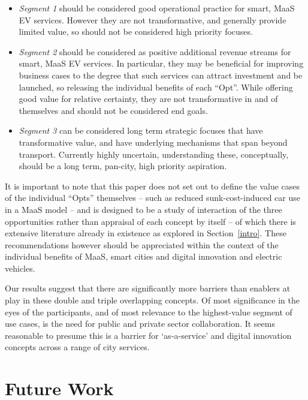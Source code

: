 \documentclass[journal]{IEEEtran}
\begin{document}
\begin{itemize}
\item {\emph{Segment 1}} should be considered good operational practice for
  smart, MaaS EV services. However they are not transformative, and
  generally provide limited value, so should not be considered high
  priority focuses. 
\item {\emph{Segment 2}} should be considered as positive additional revenue
  streams for smart, MaaS EV services. In particular, they may be
  beneficial for improving business cases to the degree that such
  services can attract investment and be launched, so releasing the
  individual benefits of each ``Opt''. While offering good value for
  relative certainty, they are not transformative in and of themselves
  and should not be considered end goals.
\item {\emph{Segment 3}} can be considered long term strategic focuses that
  have transformative value, and have underlying mechanisms that span
  beyond transport. Currently highly uncertain, understanding these,
  conceptually, should be a long term, pan-city, high priority
  aspiration.
\end{itemize}

It is important to note that this paper does not set out to define the
value cases of the individual ``Opts'' themselves -- such as reduced
sunk-cost-induced car use in a MaaS model -- and is designed to be a
study of interaction of the three opportunities rather than appraisal
of each concept by itself -- of which there is extensive literature
already in existence as explored in Section~\ref{intro}. These
recommendations however should be appreciated within the context of
the individual benefits of MaaS, smart cities and digital innovation
and electric vehicles.

Our results suggest that there are significantly more barriers than
enablers at play in these double and triple overlapping concepts. Of
most significance in the eyes of the participants, and of most
relevance to the highest-value segment of use cases, is the need for
public and private sector collaboration. It seems reasonable to
presume this is a barrier for `as-a-service' and digital innovation
concepts across a range of city services. 



\section{Future Work}\label{future}
\end{document}
